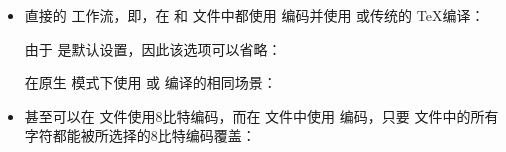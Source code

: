 \begin{itemize}

\item
直接的 \utf 工作流，即，在  和  文件中都使用 \utf 编码并使用 \pdfTeX 或传统的 \TeX 编译：

\begin{ltxexample}
\usepackage[utf8]{inputenc}
\usepackage[bibencoding=auto]{biblatex}
\end{ltxexample}
%
由于  是默认设置，因此该选项可以省略：

\begin{ltxexample}
\usepackage[utf8]{inputenc}
\usepackage{biblatex}
\end{ltxexample}

在原生 \utf 模式下使用 \XeTeX 或 \LuaTeX 编译的相同场景：

\begin{ltxexample}
\usepackage{biblatex}
\end{ltxexample}

\item
甚至可以在  文件使用8比特编码，而在  文件中使用 \utf 编码，只要  文件中的所有字符都能被所选择的8比特编码覆盖：

\begin{ltxexample}
\usepackage[latin1]{inputenc}
\usepackage[bibencoding=utf8]{biblatex}
\end{ltxexample}

\end{itemize}


